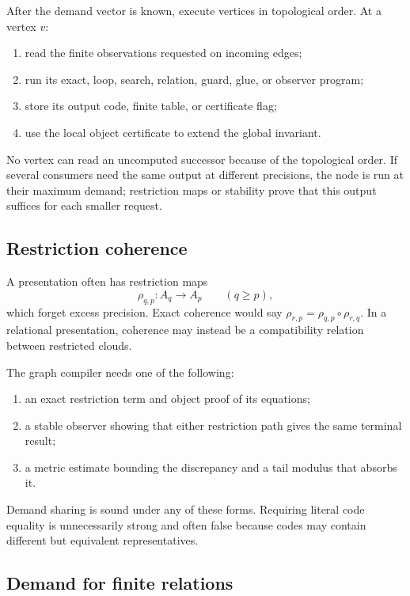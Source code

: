 After the demand vector is known, execute vertices in topological order.  At a vertex \(v\):

\begin{enumerate}
\item read the finite observations requested on incoming edges;
\item run its exact, loop, search, relation, guard, glue, or observer program;
\item store its output code, finite table, or certificate flag;
\item use the local object certificate to extend the global invariant.
\end{enumerate}

No vertex can read an uncomputed successor because of the topological order.  If several consumers need the same output at different precisions, the node is run at their maximum demand; restriction maps or stability prove that this output suffices for each smaller request.

\subsection{Restriction coherence}

A presentation often has restriction maps
\[
 \rho_{q,p}:A_q\to A_p\qquad(q\ge p),
\]
which forget excess precision.  Exact coherence would say
\(\rho_{r,p}=\rho_{q,p}\circ\rho_{r,q}\).  In a relational presentation, coherence may instead be a compatibility relation between restricted clouds.

The graph compiler needs one of the following:

\begin{enumerate}
\item an exact restriction term and object proof of its equations;
\item a stable observer showing that either restriction path gives the same terminal result;
\item a metric estimate bounding the discrepancy and a tail modulus that absorbs it.
\end{enumerate}

Demand sharing is sound under any of these forms.  Requiring literal code equality is unnecessarily strong and often false because codes may contain different but equivalent representatives.

\subsection{Demand for finite relations}


